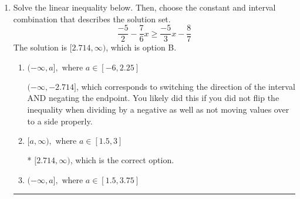 \documentclass{extbook}[14pt]
\newcommand{\litem}[1]{\item #1

\rule{\textwidth}{0.4pt}}
\begin{document}
\begin{enumerate}
{\begin{enumerate}[label=\Alph*.]
$[3.78, -1.20)$, which corresponds to flipping the inequality and getting negatives of the actual endpoints.
\item \( (-\infty, a] \cup (b, \infty), \text{ where } a \in [0.75, 5.25] \text{ and } b \in [-1.72, 0.9] \)

$(-\infty, 3.78] \cup (-1.20, \infty)$, which corresponds to displaying the and-inequality as an or-inequality AND flipping the inequality AND getting negatives of the actual endpoints.
\item \( (-\infty, a) \cup [b, \infty), \text{ where } a \in [0.75, 4.5] \text{ and } b \in [-6, 0.75] \)

$(-\infty, 3.78) \cup [-1.20, \infty)$, which corresponds to displaying the and-inequality as an or-inequality and getting negatives of the actual endpoints.
\item \( (a, b], \text{ where } a \in [-0.75, 4.5] \text{ and } b \in [-1.95, -0.67] \)

$(3.78, -1.20]$, which is the correct interval but negatives of the actual endpoints.
\item \( \text{None of the above.} \)

* This is correct as the answer should be $(-3.78, 1.20]$.
\end{enumerate}

\textbf{General Comment:} To solve, you will need to break up the compound inequality into two inequalities. Be sure to keep track of the inequality! It may be best to draw a number line and graph your solution.
}
\litem{
Solve the linear inequality below. Then, choose the constant and interval combination that describes the solution set.
\[ \frac{-5}{2} - \frac{7}{6} x \geq \frac{-5}{3} x - \frac{8}{7} \]The solution is \( [2.714, \infty) \), which is option B.\begin{enumerate}[label=\Alph*.]
\item \( (-\infty, a], \text{ where } a \in [-6, 2.25] \)

 $(-\infty, -2.714]$, which corresponds to switching the direction of the interval AND negating the endpoint. You likely did this if you did not flip the inequality when dividing by a negative as well as not moving values over to a side properly.
\item \( [a, \infty), \text{ where } a \in [1.5, 3] \)

* $[2.714, \infty)$, which is the correct option.
\item \( (-\infty, a], \text{ where } a \in [1.5, 3.75] \)


\end{enumerate}}
\end{enumerate}
\end{document}
